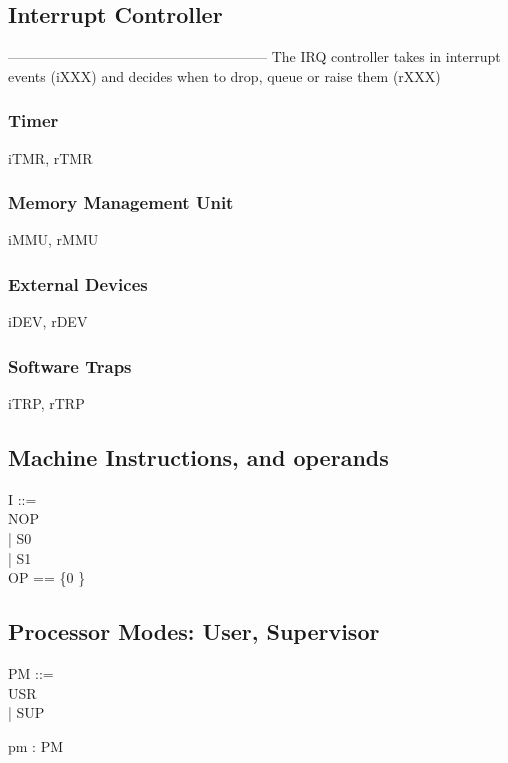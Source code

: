 \subsection{Interrupt Controller} --------------------------------------------------------
The IRQ controller takes in interrupt events (iXXX)
and decides when to drop, queue or raise them (rXXX)


\subsubsection{Timer}
\begin{circus}
\circchannel iTMR, rTMR
\end{circus}

\subsubsection{Memory Management Unit}
\begin{circus}

\circchannel iMMU, rMMU
\end{circus}

\subsubsection{External Devices}
\begin{circus}

\circchannel iDEV, rDEV
\end{circus}

\subsubsection{Software Traps}
\begin{circus}
\circchannel iTRP, rTRP
\end{circus}

\subsection{Machine Instructions, and operands} %
\begin{circus}

I ::=\\
  NOP\\   %
  | S0\\    %
  | S1\\    %

OP == \{0 \}

\end{circus}

\subsection{Processor Modes: User, Supervisor} %
\begin{circus}
PM ::=\\
 USR\\   %
 | SUP   %

\circchannel pm : PM   %
\end{circus}
